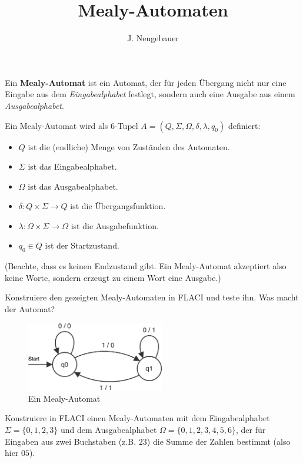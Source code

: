\documentclass[10pt, a4paper]{scrartcl}
\author{J. Neugebauer}
\title{Mealy-Automaten}
\date{\Heute}
\begin{document}
\ReiheTitel

Ein \textbf{Mealy-Automat} ist ein Automat, der für jeden Übergang nicht nur eine Eingabe aus dem \emph{Eingabealphabet} festlegt, sondern auch eine Ausgabe aus einem \emph{Ausgabealphabet}.

Ein Mealy-Automat wird als 6-Tupel $A = (Q, \Sigma, \Omega, \delta, \lambda, q_0)$ definiert:
\begin{itemize}
	\item $Q$ ist die (endliche) Menge von Zuständen des Automaten.
	\item $\Sigma$ ist das Eingabealphabet.
	\item $\Omega$ ist das Ausgabealphabet.
	\item $\delta: Q\times \Sigma\rightarrow Q$ ist die Übergangsfunktion.
	\item $\lambda: \Omega\times \Sigma\rightarrow \Omega$ ist die Ausgabefunktion.
	\item $q_0\in Q$ ist der Startzustand.
\end{itemize}

(Beachte, dass es keinen Endzustand gibt. Ein Mealy-Automat akzeptiert also keine Worte, sondern erzeugt zu einem Wort eine Ausgabe.)

\begin{aufgabe}
	Konstruiere den gezeigten Mealy-Automaten in FLACI und teste ihn. Was macht der Automat?
	
	\begin{figure}[h]\centering
		\includegraphics[width=6cm]{Q1-LK-AB.4-Abb_Mealy_1}
		\caption{Ein Mealy-Automat}
	\end{figure}
\end{aufgabe}

\begin{aufgabe}
	Konstruiere in FLACI einen Mealy-Automaten mit dem Eingabealphabet $\Sigma = \{ 0, 1, 2, 3 \}$ und dem Ausgabealphabet $\Omega = \{ 0, 1, 2, 3, 4, 5, 6 \}$, der für Eingaben aus zwei Buchstaben (z.B. $23$) die Summe der Zahlen bestimmt (also hier $05$).
	
\end{aufgabe}
\end{document}
